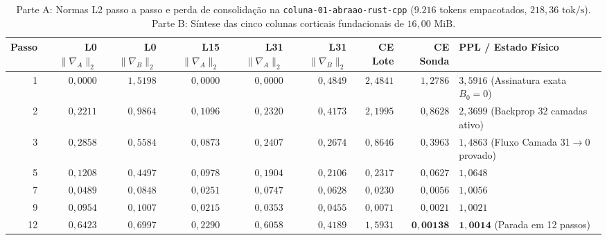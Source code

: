 \documentclass[10pt,a4paper]{article}
\begin{document}
\begin{table}[!htbp]
\centering
\caption{Parte A: Normas L2 passo a passo e perda de consolida\c{c}\~ao na \texttt{coluna-01-abraao-rust-cpp} ($9.216$ tokens empacotados, $218,36\text{ tok/s}$). Parte B: S\'intese das cinco colunas corticais fundacionais de $16,00\text{ MiB}$.}
\label{tab:autograd}
\footnotesize
\begin{tabularx}{\linewidth}{@{}rrrrrrrrY@{}}
\toprule
\textbf{Passo} & \textbf{L0 $\|\nabla_A\|_2$} & \textbf{L0 $\|\nabla_B\|_2$} & \textbf{L15 $\|\nabla_A\|_2$} & \textbf{L31 $\|\nabla_A\|_2$} & \textbf{L31 $\|\nabla_B\|_2$} & \textbf{CE Lote} & \textbf{CE Sonda} & \textbf{PPL / Estado F\'isico} \\
  & $0,0000$ & $1,5198$ & $0,0000$ & $0,0000$ & $0,4849$ & $2,4841$ & $1,2786$ & $3,5916$ (Assinatura exata $B_0=0$) \\
2  & $0,2211$ & $0,9864$ & $0,1096$ & $0,2320$ & $0,4173$ & $2,1995$ & $0,8628$ & $2,3699$ (Backprop 32 camadas ativo) \\
3  & $0,2858$ & $0,5584$ & $0,0873$ & $0,2407$ & $0,2674$ & $0,8646$ & $0,3963$ & $1,4863$ (Fluxo Camada 31$\to$0 provado) \\
5  & $0,1208$ & $0,4497$ & $0,0978$ & $0,1904$ & $0,2106$ & $0,2317$ & $0,0627$ & $1,0648$ \\
7  & $0,0489$ & $0,0848$ & $0,0251$ & $0,0747$ & $0,0628$ & $0,0230$ & $0,0056$ & $1,0056$ \\
9  & $0,0954$ & $0,1007$ & $0,0215$ & $0,0353$ & $0,0455$ & $0,0071$ & $0,0021$ & $1,0021$ \\
12 & $0,6423$ & $0,6997$ & $0,2290$ & $0,6058$ & $0,4189$ & $1,5931$ & $\mathbf{0,00138}$ & $\mathbf{1,0014}$ (Parada em 12 passos) \\
\bottomrule
\end{tabularx}


\end{table}
\end{document}
